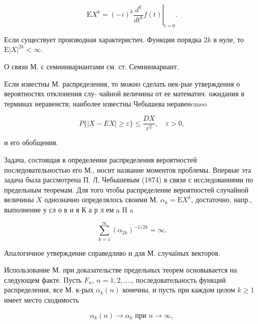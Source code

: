 \documentclass[10pt]{article}
\begin{document}
\[

\mathrm{E} X^{k}=\left.(-i)^{k} \frac{d^{k}}{d t^{k}} f(t)\right|_{t=0} .

\]



Если существует производная характеристич. Функции порядка $2 k$ в нуле, то $\mathrm{E}|X|^{2 k}<\infty$.



О связи М. с семиинвариантами см. ст. Семиинвариант.



Если известны М. распределения, то можно сделать нек-рые утверждения о вероятностях отклонения слу- чайной величины от ее математич. ожидания в терминах неравенств; наиболее известны Чебышева неравенcmeo



\[

P\{|X-E X| \geqslant \varepsilon\} \leqslant \frac{D X}{\varepsilon^{2}}, \quad \varepsilon>0,

\]



и его обобщения.



Задача, состоящая в определении распределения вероятностей последовательностью его М., носит название моментов проблемы. Впервые эта задача была рассмотрена П. Л. Чебышевым (1874) в связи с исследованиями по предельным теоремам. Для того чтобы распределение вероятностей случайной величины $X$ однозначно определялось своими М. $\alpha_{k}=\mathrm{E} X^{k}$, достаточно, напр., выполнение у сл о в и я К а р л ем a H a



\[

\sum_{k=1}^{\infty}\left(\alpha_{2 k}\right)^{-1 / 2 k}=\infty .

\]



Апалогичное утверждение справедливо и для М. случаїных векторов.



Использование М. при доказательстве предельных теорем основывается на следующем факте. Пусть $F_{n}$, $n=1,2, \ldots .$, последовательность функций распределения, все М. к-рых $\alpha_{k}(n)$ конечны, и пусть при каждом целом $k \geqslant 1$ имеет место сходимость



\[

\alpha_{k}(n) \longrightarrow \alpha_{k} \text { при } n \longrightarrow \infty,

\]
\end{document}
